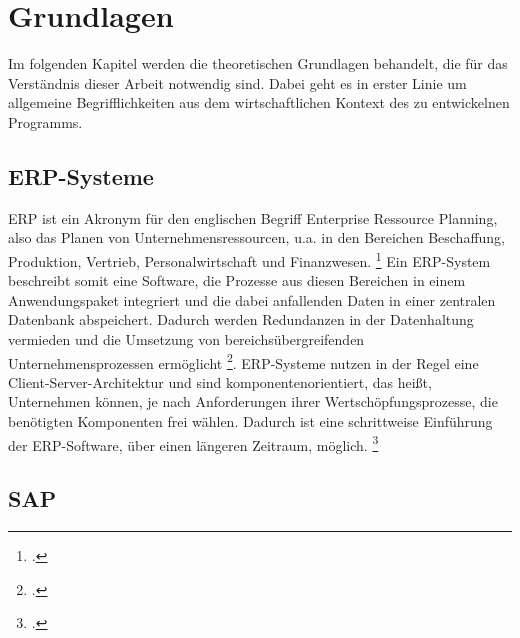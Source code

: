 \section{Grundlagen}
Im folgenden Kapitel werden die theoretischen Grundlagen behandelt, die für das Verständnis dieser Arbeit notwendig sind. Dabei geht es in erster Linie um allgemeine Begrifflichkeiten aus dem wirtschaftlichen Kontext des zu entwickelnen Programms.

\subsection{ERP-Systeme}
ERP ist ein Akronym für den englischen Begriff \glqq{}Enterprise Ressource Planning\grqq{}, also das Planen von Unternehmensressourcen, u.a. in den Bereichen Beschaffung, Produktion, Vertrieb, Personalwirtschaft und Finanzwesen. \footcite[Vgl.][523]{wibuch} Ein ERP-System beschreibt somit eine Software, die Prozesse aus diesen Bereichen in einem Anwendungspaket integriert und die dabei anfallenden Daten in einer zentralen Datenbank abspeichert. Dadurch werden Redundanzen in der Datenhaltung vermieden und die Umsetzung von bereichsübergreifenden Unternehmensprozessen ermöglicht \footcite[Vgl.][523]{wibuch}. ERP-Systeme nutzen in der Regel eine Client-Server-Architektur und sind komponentenorientiert, das heißt, Unternehmen können, je nach Anforderungen ihrer Wertschöpfungsprozesse, die benötigten Komponenten frei wählen. Dadurch ist eine schrittweise Einführung der ERP-Software, über einen längeren Zeitraum, möglich. \footcite[Vgl.][524 f.]{wibuch}

\subsection{SAP}
